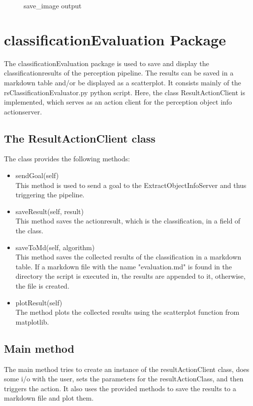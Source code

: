 \documentclass[main.tex]{subfiles}
\begin{document}
\begin{figure}[H]
{        			}
   			 \caption{save\_image output}
  		\end{figure}

\section{classificationEvaluation Package}

The classificationEvaluation package is used to save and display the classificationresults of the perception pipeline. The results can be saved in a markdown table and/or be displayed as a scatterplot. It consists mainly of the rsClassificationEvaluator.py python script. Here, the class ResultActionClient is implemented, which serves as an action client for the perception object info actionserver.\\

\subsection{The ResultActionClient class}
The class provides the following methods:

\begin{itemize}
\item 
sendGoal(self)\\
This method is used to send a goal to the ExtractObjectInfoServer and thus triggering the pipeline.

\item saveResult(self, result)\\
This method saves the actionresult, which is the classification, in a field of the class.

\item saveToMd(self, algorithm)\\
This method saves the collected results of the classification in a markdown table. If a markdown file with the name "evaluation.md" is found in the directory the script is executed in, the results are appended to it, otherwise, the file is created.

\item plotResult(self)\\
The method plots the collected results using the scatterplot function from matplotlib.
\end{itemize}

\subsection{Main method}
The main method tries to create an instance of the resultActionClient class, does some i/o with the user, sets the parameters for the resultActionClass, and then triggers the action. It also uses the provided methods to save the results to a markdown file and plot them.
\end{document}
